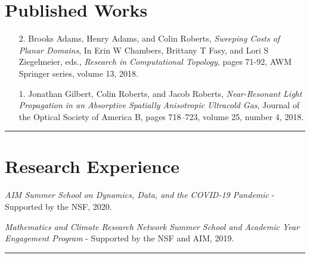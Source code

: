 \documentclass[12pt]{article} %
\begin{document}
\section{Published Works}
\begin{flushleft}
\begin{itemize}[leftmargin=*]
    \item[2.] Brooks Adams, Henry Adams, and Colin Roberts, \textit{Sweeping Costs of Planar Domains}, In Erin W Chambers, Brittany T Fasy, and Lori S Ziegelmeier, eds., \emph{Research in Computational Topology}, pages 71-92, AWM Springer series, volume 13, 2018.
    
    \item[1.] Jonathan Gilbert, Colin Roberts, and Jacob Roberts, \textit{Near-Resonant Light Propagation in an Absorptive Spatially Anisotropic Ultracold Gas}, Journal of the Optical Society of America B, pages 718–723, volume 25, number 4, 2018.
\end{itemize}
\end{flushleft}
\rule{\textwidth}{0.5mm}

\section{Research Experience}
\begin{flushleft}
    \emph{AIM Summer School on Dynamics, Data, and the COVID-19 Pandemic} - Supported by the NSF, 2020.\\
\vspace*{5pt}

    \emph{Mathematics and Climate Research Network Summer School and Academic Year Engagement Program} - Supported by the NSF and AIM, 2019.
\end{flushleft}
\rule{\textwidth}{0.5mm}
\end{document}
